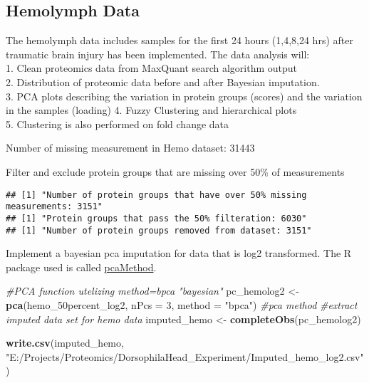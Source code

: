 \documentclass[]{article}
\newenvironment{Shaded}{\begin{snugshade}}{\end{snugshade}}
\newcommand{\KeywordTok}[1]{\textcolor[rgb]{0.13,0.29,0.53}{\textbf{#1}}}
\newcommand{\DataTypeTok}[1]{\textcolor[rgb]{0.13,0.29,0.53}{#1}}
\newcommand{\DecValTok}[1]{\textcolor[rgb]{0.00,0.00,0.81}{#1}}
\newcommand{\StringTok}[1]{\textcolor[rgb]{0.31,0.60,0.02}{#1}}
\newcommand{\CommentTok}[1]{\textcolor[rgb]{0.56,0.35,0.01}{\textit{#1}}}
\newcommand{\NormalTok}[1]{#1}
\begin{document}
\subsection{Hemolymph Data}\label{hemolymph-data}

The hemolymph data includes samples for the first 24 hours (1,4,8,24
hrs) after traumatic brain injury has been implemented. The data
analysis will:\\
1. Clean proteomics data from MaxQuant search algorithm output\\
2. Distribution of proteomic data before and after Bayesian
imputation.\\
3. PCA plots describing the variation in protein groups (scores) and the
variation in the samples (loading) 4. Fuzzy Clustering and hierarchical
plots\\
5. Clustering is also performed on fold change data

Number of missing measurement in Hemo dataset: 31443

Filter and exclude protein groups that are missing over 50\% of
measurements

\begin{verbatim}
## [1] "Number of protein groups that have over 50% missing measurements: 3151"
## [1] "Protein groups that pass the 50% filteration: 6030"
## [1] "Number of protein groups removed from dataset: 3151"
\end{verbatim}

Implement a bayesian pca imputation for data that is log2 transformed.
The R package used is called
\href{https://www.bioconductor.org/packages/devel/bioc/manuals/pcaMethods/man/pcaMethods.pdf}{pcaMethod}.

\begin{Shaded}
\begin{Highlighting}[]
\CommentTok{#PCA function utelizing method=bpca "bayesian"}
\NormalTok{pc_hemolog2 <-}\StringTok{ }\KeywordTok{pca}\NormalTok{(hemo_50percent_log2, }\DataTypeTok{nPcs =} \DecValTok{3}\NormalTok{, }\DataTypeTok{method =} \StringTok{"bpca"}\NormalTok{) }\CommentTok{#pca method}
\CommentTok{#extract imputed data set for hemo data}
\NormalTok{imputed_hemo <-}\StringTok{ }\KeywordTok{completeObs}\NormalTok{(pc_hemolog2)}

\KeywordTok{write.csv}\NormalTok{(imputed_hemo, }\StringTok{"E:/Projects/Proteomics/DorsophilaHead_Experiment/Imputed_hemo_log2.csv"}\NormalTok{)}
\end{Highlighting}
\end{Shaded}
\end{document}
